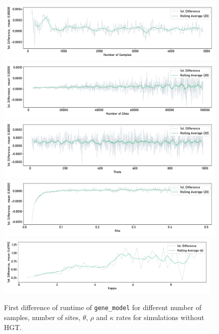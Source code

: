 \begin{figure}[H]
    \begin{flushright}
        \includegraphics[width=\textwidth]{figures/runtime/num_samples_diff.pdf}\\
        \includegraphics[width=\textwidth]{figures/runtime/num_sites_diff.pdf}\\
        \includegraphics[width=\textwidth]{figures/runtime/theta_diff.pdf}\\
        \includegraphics[width=\textwidth]{figures/runtime/rho_diff.pdf}\\
        \includegraphics[width=0.975\textwidth]{figures/runtime/gene_conversion_rate_large_diff.pdf}
    \end{flushright}
    \centering
    \caption[First difference of runtime without HGT.]{First difference of runtime of \texttt{gene_model} for different number of samples, number of sites, $\theta$, $\rho$ and $\kappa$ rates
        for simulations without HGT.}
    \label{app:diff-runtime}
\end{figure}

